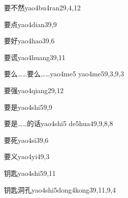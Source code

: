 \begin{verbete}{要不然}{yao4bu4ran2}{9,4,12}
\end{verbete}

\begin{verbete}{要点}{yao4dian3}{9,9}
\end{verbete}

\begin{verbete}{要好}{yao4hao3}{9,6}
\end{verbete}

\begin{verbete}{要谎}{yao4huang3}{9,11}
\end{verbete}

\begin{verbete}{要么……要么……}{yao4me5 yao4me5}{9,3,9,3}
\end{verbete}

\begin{verbete}{要强}{yao4qiang2}{9,12}
\end{verbete}

\begin{verbete}{要是}{yao4shi5}{9,9}
\end{verbete}

\begin{verbete}{要是……的话}{yao4shi5 de5hua4}{9,9,8,8}
\end{verbete}

\begin{verbete}{要死}{yao4si3}{9,6}
\end{verbete}

\begin{verbete}{要义}{yao4yi4}{9,3}
\end{verbete}

\begin{verbete}{钥匙}{yao4shi5}{9,11}
\end{verbete}

\begin{verbete}{钥匙洞孔}{yao4shi5dong4kong3}{9,11,9,4}
\end{verbete}

